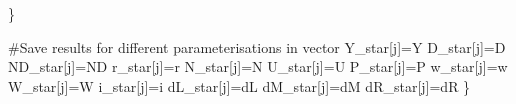 \documentclass[
  letterpaper,
  DIV=11,
  numbers=noendperiod]{scrreprt}
\newenvironment{Shaded}{\begin{snugshade}}{\end{snugshade}}
\newcommand{\CommentTok}[1]{\textcolor[rgb]{0.37,0.37,0.37}{#1}}
\newcommand{\NormalTok}[1]{\textcolor[rgb]{0.00,0.23,0.31}{#1}}
\newcommand{\OtherTok}[1]{\textcolor[rgb]{0.00,0.23,0.31}{#1}}
\begin{document}
\begin{Shaded}
\begin{Highlighting}[]
\NormalTok{  \}}

  \CommentTok{\#Save results for different parameterisations in vector}
\NormalTok{  Y\_star[j]}\OtherTok{=}\NormalTok{Y}
\NormalTok{  D\_star[j]}\OtherTok{=}\NormalTok{D}
\NormalTok{  ND\_star[j]}\OtherTok{=}\NormalTok{ND}
\NormalTok{  r\_star[j]}\OtherTok{=}\NormalTok{r}
\NormalTok{  N\_star[j]}\OtherTok{=}\NormalTok{N}
\NormalTok{  U\_star[j]}\OtherTok{=}\NormalTok{U}
\NormalTok{  P\_star[j]}\OtherTok{=}\NormalTok{P}
\NormalTok{  w\_star[j]}\OtherTok{=}\NormalTok{w}
\NormalTok{  W\_star[j]}\OtherTok{=}\NormalTok{W}
\NormalTok{  i\_star[j]}\OtherTok{=}\NormalTok{i}
\NormalTok{  dL\_star[j]}\OtherTok{=}\NormalTok{dL}
\NormalTok{  dM\_star[j]}\OtherTok{=}\NormalTok{dM}
\NormalTok{  dR\_star[j]}\OtherTok{=}\NormalTok{dR  }
\NormalTok{\}}
\end{Highlighting}
\end{Shaded}
\end{document}

